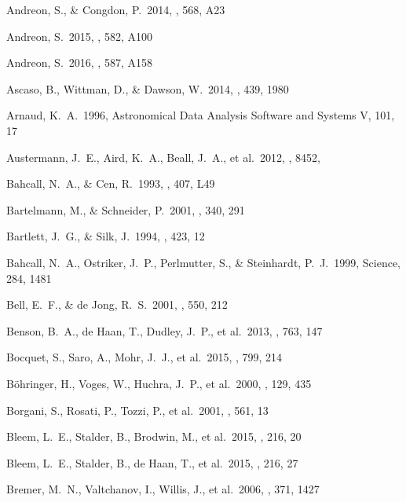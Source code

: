 \documentclass[apj,twocolumn]{emulateapj}
\begin{document}
{\begin{thebibliography}{88}
 Andreon, S., \& Congdon, P.\ 2014, \aap, 568, A23 

 Andreon, S.\ 2015, \aap, 582, A100 

 Andreon, S.\ 2016, \aap, 587, A158 

 Ascaso, B., Wittman, D., \& Dawson, W.\ 2014, \mnras, 439, 1980 

 Arnaud, K.~A.\ 1996, Astronomical Data Analysis Software and Systems V, 101, 17 

 Austermann, J.~E.,  Aird, K.~A., Beall, J.~A., et al.\ 2012, \procspie, 8452,  

 Bahcall, N.~A., \& Cen, R.\ 1993, \apjl, 407, L49 

 Bartelmann, M., \& Schneider, P.\ 2001, \physrep, 340, 291 

 Bartlett, J.~G., \& Silk, J.\ 1994, \apj, 423, 12 

 Bahcall, N.~A., Ostriker, J.~P., Perlmutter, S., \& Steinhardt, P.~J.\ 1999, Science, 284, 1481 

 Bell, E.~F., \& de Jong, R.~S.\ 2001, \apj, 550, 212 

 Benson, B.~A., de Haan, T., Dudley, J.~P., et al.\ 2013, \apj, 763, 147 

 Bocquet, S., Saro, A., Mohr, J.~J., et al.\ 2015, \apj, 799, 214 

 B{\"o}hringer, H., Voges, W., Huchra, J.~P., et al.\ 2000, \apjs, 129, 435 

 Borgani, S., Rosati, P., Tozzi, P., et al.\ 2001, \apj, 561, 13 

 Bleem, L.~E., Stalder, B., Brodwin, M., et al.\ 2015, \apjs, 216, 20 

 Bleem, L.~E., Stalder, B., de Haan, T., et al.\ 2015, \apjs, 216, 27 

 Bremer, M.~N., Valtchanov, I., Willis, J., et al.\ 2006, \mnras, 371, 1427 


\end{thebibliography}}
\end{document}
